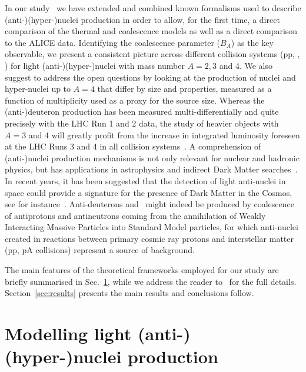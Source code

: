 \documentclass[a4paper,11pt]{article}
\begin{document}
In our study~\cite{Bellini:2018epz} we have extended and combined known formalisms used to describe (anti-)(hyper-)nuclei production in order to allow, for the first time, a direct comparison of the thermal and coalescence models as well as a direct comparison to the ALICE data. 
Identifying the coalescence parameter ($B_A$) as the key observable, we present a consistent picture across different collision systems (pp, \pPb, \PbPb) for light (anti-)(hyper-)nuclei with mass number $A = 2, 3$ and 4.
We also suggest to address the open questions by looking at the production of nuclei and hyper-nuclei up to $A = 4$ that differ by size and properties, measured as a function of multiplicity used as a proxy for the source size. 
Whereas the (anti-)deuteron production has been measured multi-differentially and quite precisely with the LHC Run 1 and 2 data, the study of heavier objects with $A=3$ and 4 will greatly profit from the increase in integrated luminosity foreseen at the LHC Runs 3 and 4 in all collision systems~\cite{Citron:2018lsq}. 
A comprehension of (anti-)nuclei production mechanisms is not only relevant for nuclear and hadronic physics, but has applications in astrophysics and indirect Dark Matter searches~\cite{Aramaki:2015pii}. In recent years, it has been suggested that the detection of light anti-nuclei in space could provide a signature for the presence of Dark Matter in the Cosmos, see for instance~\cite{Cirelli:2014qia, Korsmeier:2017xzj}. 
Anti-deuterons and \antihethree~might indeed be produced by coalescence of antiprotons and antineutrons coming from the annihilation of Weakly Interacting Massive Particles into Standard Model particles, for which anti-nuclei created in reactions between primary cosmic ray protons and interstellar matter (pp, pA collisions) represent a source of background.

The main features of the theoretical frameworks employed for our study are briefly summarised in Sec.~\ref{sec:prod}, while we address the reader to~\cite{Bellini:2018epz} for the full details. Section~\ref{sec:results} presents the main results and conclusions follow.


\section{Modelling light (anti-)(hyper-)nuclei production} \label{sec:prod}
\end{document}
